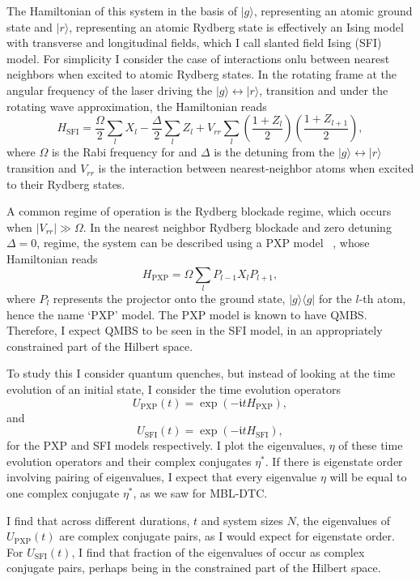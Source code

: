 \documentclass[longbibliography]{revtex4-2}
\newcommand{\im}[0]{\mathfrak{i}}
\begin{document}
The Hamiltonian of this system in the basis of $| g \rangle$,
representing an atomic ground state and $| r \rangle$, representing an
atomic Rydberg state is effectively an Ising model with transverse and
longitudinal fields, which I call slanted field Ising
(SFI) model. For simplicity I consider the case of interactions onlu
between nearest neighbors when excited to atomic Rydberg states. In
the rotating frame at the angular frequency of the laser driving the
$| g \rangle \leftrightarrow | r \rangle$, transition and under the
rotating wave approximation, the Hamiltonian reads
\begin{equation}
    H_{\mathrm{SFI}}
    =
    \frac{\Omega}{2} \sum_{l} X_{l} -
    \frac{\Delta}{2} \sum_{l} Z_{l} +
    V_{rr} \sum_{l} \left( \frac{1 + Z_{l}}{2} \right)
                    \left( \frac{1 + Z_{l+1}}{2} \right),
\end{equation}
where $\Omega$ is the Rabi frequency for and $\Delta$ is the detuning
from the $| g \rangle \leftrightarrow | r \rangle$ transition and
$V_{rr}$ is the interaction between nearest-neighbor atoms when
excited to their Rydberg states.

A common regime of operation is the Rydberg blockade regime, which
occurs when $|V_{rr}| \gg \Omega$. In the nearest neighbor Rydberg
blockade and zero detuning $\Delta = 0$, regime, the system can be
described using a PXP model
~\cite{turner2018weak, turner2018quantum, maskara2021discrete},
whose Hamiltonian reads
\begin{equation}
    H_{\mathrm{PXP}} = \Omega \sum_{l} P_{l-1} X_{l} P_{l+1},
\end{equation}
where $P_{l}$ represents the projector onto the ground state,
$| g \rangle \langle g |$ for the $l$-th atom, hence the name `PXP'
model. The PXP model is known to have QMBS. Therefore, I expect QMBS
to be seen in the SFI model, in an appropriately constrained part of
the Hilbert space.

To study this I consider quantum quenches, but instead of looking at
the time evolution of an initial state, I consider the time evolution
operators
\begin{equation}
    U_{\mathrm{PXP}}(t) = \exp\left(-\im t H_{\mathrm{PXP}}\right),
\end{equation}
and
\begin{equation}
    U_{\mathrm{SFI}}(t) = \exp\left(-\im t H_{\mathrm{SFI}}\right),
\end{equation}
for the PXP and SFI models respectively. I plot the eigenvalues, $\eta$
of these time evolution operators and their complex conjugates $\eta^*$.
If there is eigenstate order involving pairing of eigenvalues, I expect
that every eigenvalue $\eta$ will be equal to one complex conjugate
$\eta^*$, as we saw for MBL-DTC.

I find that across different durations, \(t\) and system sizes \(N\),
the eigenvalues of \(U_{\mathrm{PXP}}(t)\) are complex conjugate
pairs, as I would expect for eigenstate
order. For \(U_{\mathrm{SFI}}(t)\), I find that fraction of the
eigenvalues of occur as complex conjugate pairs, perhaps being in the
constrained part of the Hilbert space.




\end{document}
